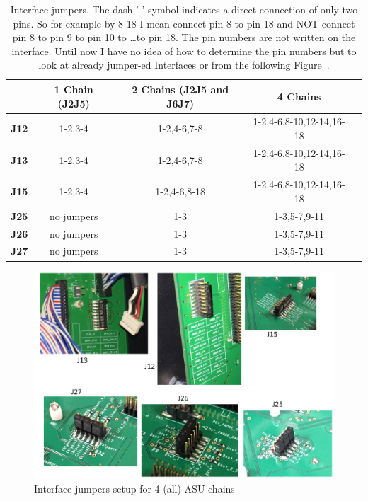 \begin{table}[H]
  \centering \bgroup
  \def\arraystretch{1.5}%
  \begin{tabular}{|c|c|c|c|c|}
    \hline
    & \textbf{1 Chain (J2J5)} & \textbf{2 Chains (J2J5 and J6J7)} & \textbf{4 Chains} \\
    \hline
    \textbf{J12} & 1-2,3-4  & 1-2,4-6,7-8 & 1-2,4-6,8-10,12-14,16-18 \\
    \hline
    \textbf{J13} & 1-2,3-4  & 1-2,4-6,7-8 & 1-2,4-6,8-10,12-14,16-18 \\
    \hline
    \textbf{J15} & 1-2,3-4  & 1-2,4-6,8-18 & 1-2,4-6,8-10,12-14,16-18 \\
    \hline
    \textbf{J25} & no jumpers & 1-3 & 1-3,5-7,9-11 \\
    \hline
    \textbf{J26} & no jumpers & 1-3 & 1-3,5-7,9-11 \\
    \hline
    \textbf{J27} & no jumpers & 1-3 & 1-3,5-7,9-11 \\
    \hline
  \end{tabular}
  \egroup
  \caption{Interface jumpers. The dash '-' symbol indicates a direct connection
    of only two pins. So for example by 8-18 I mean connect pin 8 to pin 18 and NOT
    connect pin 8 to pin 9 to pin 10 to \dots to pin 18. The pin numbers are not
    written on the interface. Until now I have no idea of how to determine the pin
    numbers but to look at already jumper-ed Interfaces or from the following
    Figure~\label{interface-jumpers}.}\label{tab:IF-jumpers}
\end{table}
\begin{figure}[H] \centering
  \includegraphics[width=0.8\linewidth]{interface-jumpers}
  \caption{Interface jumpers setup for 4 (all) ASU chains}\label{interface-jumpers}
\end{figure}

